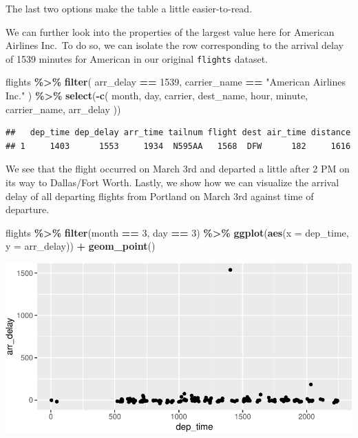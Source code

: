 \documentclass[12pt,twoside]{book}
\newenvironment{Shaded}{\begin{snugshade}}{\end{snugshade}}
\newcommand{\AttributeTok}[1]{\textcolor[rgb]{0.13,0.29,0.53}{#1}}
\newcommand{\DecValTok}[1]{\textcolor[rgb]{0.00,0.00,0.81}{#1}}
\newcommand{\FunctionTok}[1]{\textcolor[rgb]{0.13,0.29,0.53}{\textbf{#1}}}
\newcommand{\NormalTok}[1]{#1}
\newcommand{\SpecialCharTok}[1]{\textcolor[rgb]{0.81,0.36,0.00}{\textbf{#1}}}
\newcommand{\StringTok}[1]{\textcolor[rgb]{0.31,0.60,0.02}{#1}}
\begin{document}
The last two options make the table a little easier-to-read.

We can further look into the properties of the largest value here for American Airlines Inc.~To do so, we can isolate the row corresponding to the arrival delay of 1539 minutes for American in our original \texttt{flights} dataset.

\begin{Shaded}
\begin{Highlighting}[]
\NormalTok{flights }\SpecialCharTok{\%\textgreater{}\%}
  \FunctionTok{filter}\NormalTok{(}
\NormalTok{    arr\_delay }\SpecialCharTok{==} \DecValTok{1539}\NormalTok{,}
\NormalTok{    carrier\_name }\SpecialCharTok{==} \StringTok{"American Airlines Inc."}
\NormalTok{  ) }\SpecialCharTok{\%\textgreater{}\%}
  \FunctionTok{select}\NormalTok{(}\SpecialCharTok{{-}}\FunctionTok{c}\NormalTok{(}
\NormalTok{    month, day, carrier, dest\_name, hour,}
\NormalTok{    minute, carrier\_name, arr\_delay}
\NormalTok{  ))}
\end{Highlighting}
\end{Shaded}

\begin{verbatim}
##   dep_time dep_delay arr_time tailnum flight dest air_time distance
## 1     1403      1553     1934  N595AA   1568  DFW      182     1616
\end{verbatim}

We see that the flight occurred on March 3rd and departed a little after 2 PM on its way to Dallas/Fort Worth. Lastly, we show how we can visualize the arrival delay of all departing flights from Portland on March 3rd against time of departure.

\begin{Shaded}
\begin{Highlighting}[]
\NormalTok{flights }\SpecialCharTok{\%\textgreater{}\%}
  \FunctionTok{filter}\NormalTok{(month }\SpecialCharTok{==} \DecValTok{3}\NormalTok{, day }\SpecialCharTok{==} \DecValTok{3}\NormalTok{) }\SpecialCharTok{\%\textgreater{}\%}
  \FunctionTok{ggplot}\NormalTok{(}\FunctionTok{aes}\NormalTok{(}\AttributeTok{x =}\NormalTok{ dep\_time, }\AttributeTok{y =}\NormalTok{ arr\_delay)) }\SpecialCharTok{+}
  \FunctionTok{geom\_point}\NormalTok{()}
\end{Highlighting}
\end{Shaded}

\includegraphics{my-thesis_files/figure-latex/march3plot-1.pdf}
\end{document}

